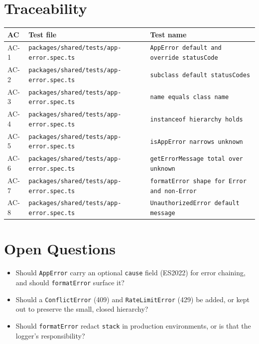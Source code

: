 \section{Traceability}

\begin{center}
\begin{tabular}{@{}lll@{}}
\toprule
AC & Test file & Test name \\
\midrule
AC-1 & \texttt{packages/shared/tests/app-error.spec.ts} & \texttt{AppError default and override statusCode} \\
AC-2 & \texttt{packages/shared/tests/app-error.spec.ts} & \texttt{subclass default statusCodes} \\
AC-3 & \texttt{packages/shared/tests/app-error.spec.ts} & \texttt{name equals class name} \\
AC-4 & \texttt{packages/shared/tests/app-error.spec.ts} & \texttt{instanceof hierarchy holds} \\
AC-5 & \texttt{packages/shared/tests/app-error.spec.ts} & \texttt{isAppError narrows unknown} \\
AC-6 & \texttt{packages/shared/tests/app-error.spec.ts} & \texttt{getErrorMessage total over unknown} \\
AC-7 & \texttt{packages/shared/tests/app-error.spec.ts} & \texttt{formatError shape for Error and non-Error} \\
AC-8 & \texttt{packages/shared/tests/app-error.spec.ts} & \texttt{UnauthorizedError default message} \\
\bottomrule
\end{tabular}
\end{center}

\section{Open Questions}
\begin{itemize}[leftmargin=1.2em]
  \item Should \texttt{AppError} carry an optional \texttt{cause} field (ES2022) for error chaining, and should \texttt{formatError} surface it?
  \item Should a \texttt{ConflictError} (409) and \texttt{RateLimitError} (429) be added, or kept out to preserve the small, closed hierarchy?
  \item Should \texttt{formatError} redact \texttt{stack} in production environments, or is that the logger's responsibility?
\end{itemize}


